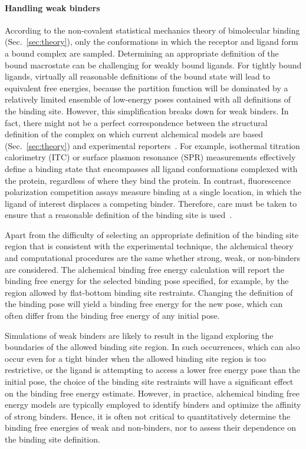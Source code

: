 \documentclass[9pt,bestpractices]{livecoms}
\begin{document}
\paragraph{Handling weak binders}\label{sec:weak-binders}
According to the non-covalent statistical mechanics theory of bimolecular binding (Sec.~\ref{sec:theory}), only the conformations in which the receptor and ligand form a bound complex are sampled. Determining an appropriate definition of the bound macrostate can be challenging for weakly bound ligands. For tightly bound ligands, virtually all reasonable definitions of the bound state will lead to equivalent free energies, because the partition function will be dominated by a relatively limited ensemble of low-energy poses contained with all definitions of the binding site. However, this simplification breaks down for weak binders.  In fact, there might not be a perfect correspondence between the structural definition of the complex on which current alchemical models are based~\cite{gilson1997statisticalthermodynamic} (Sec.~\ref{sec:theory}) and experimental reporters~\cite{mihailescu2004theory}. For example, isothermal titration calorimetry (ITC) or surface plasmon resonance (SPR) measurements effectively define a binding state that encompasses all ligand conformations complexed with the protein, regardless of where they bind the protein. In contrast, fluorescence polarization competition assays measure binding at a single location, in which the ligand of interest displaces a competing binder. Therefore, care must be taken to ensure that a reasonable definition of the binding site is used~\cite{wang2013identifying}.

Apart from the difficulty of selecting an appropriate definition of the binding site region that is consistent with the experimental technique, the alchemical theory and computational procedures are the same whether strong, weak, or non-binders are considered. The alchemical binding free energy calculation will report the binding free energy for the selected binding pose specified, for example, by the region allowed by flat-bottom binding site restraints. Changing the definition of the binding pose will yield a binding free energy for the new pose, which can often differ from the binding free energy of any initial pose. 

Simulations of weak binders are likely to result in the ligand exploring the boundaries of the allowed binding site region. In such occurrences, which can also occur even for a tight binder when the allowed binding site region is too restrictive, or the ligand is attempting to access a lower free energy pose than the initial pose, the choice of the binding site restraints will have a significant effect on the binding free energy estimate. However, in practice, alchemical binding free energy models are typically employed to identify binders and optimize the affinity of strong binders. Hence, it is often not critical to quantitatively determine the binding free energies of weak and non-binders, nor to assess their dependence on the binding site definition.
\end{document}
